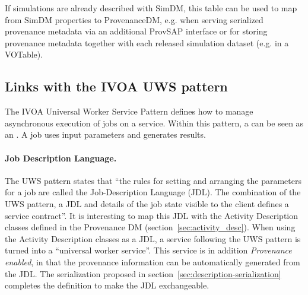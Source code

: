 If simulations are already described with SimDM, this table can be used
to map from SimDM properties to ProvenanceDM, e.g. when serving serialized provenance metadata via an additional ProvSAP interface or for storing provenance metadata together with each released simulation dataset (e.g. in a VOTable).





\subsection{Links with the IVOA UWS pattern}
\label{sec:uws_links}

The IVOA Universal Worker Service Pattern \citep{std:UWS} defines how to manage asynchronous execution of jobs on a service. Within this pattern, a  can be seen as an . A job uses input parameters and generates results.

\paragraph{Job Description Language.}
The UWS pattern states that ``the rules for setting and arranging the parameters for a job are called the Job-Description Language (JDL). The combination of the UWS pattern, a JDL and details of the job state visible to the client defines a service contract''.
It is interesting to map this JDL with the Activity Description classes defined in the Provenance DM (section~\ref{sec:activity_desc}). When using the Activity Description classes as a JDL, a service following the UWS pattern is turned into a ``universal worker service''. This service is in addition \emph{Provenance enabled}, in that the provenance information can be automatically generated from the JDL.
The serialization proposed in section~\ref{sec:description-serialization} completes the definition to make the JDL exchangeable.

